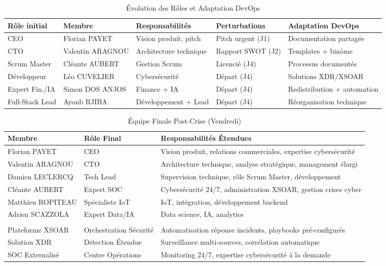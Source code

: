 \documentclass[12pt,a4paper]{article}
\begin{document}
\begin{table}[H]
\centering
\caption{Évolution des Rôles et Adaptation DevOps}
\begin{tabular}{|p{2.5cm}|p{2cm}|p{3cm}|p{3cm}|p{3cm}|}
\hline
\textbf{Rôle initial} & \textbf{Membre} & \textbf{Responsabilités} & \textbf{Perturbations} & \textbf{Adaptation DevOps} \\
\hline
CEO & Florian PAYET & Vision produit, pitch & Pitch urgent (J1) & Documentation partagée \\
\hline
CTO & Valentin ARAGNOU & Architecture technique & Rapport SWOT (J2) & Templates + binôme \\
\hline
Scrum Master & Cléante AUBERT & Gestion Scrum & Licencié (J4) & Processus documentés \\
\hline
Développeur & Léo CUVELIER & Cybersécurité & Départ (J4) & Solutions XDR/XSOAR \\
\hline
Expert Fin./IA & Simon DOS ANJOS & Finance + IA & Départ (J4) & Redistribution + automation \\
\hline
Full-Stack Lead & Ayoub RJIBA & Développement + Lead & Départ (J4) & Réorganisation technique \\
\hline
\end{tabular}
\end{table}

\begin{table}[H]
\centering
\caption{Équipe Finale Post-Crise (Vendredi)}
\begin{tabular}{|p{3cm}|p{3cm}|p{6cm}|}
\hline
\textbf{Membre} & \textbf{Rôle Final} & \textbf{Responsabilités Étendues} \\
\hline
\rowcolor{blue!10}
Florian PAYET & CEO & Vision produit, relations commerciales, expertise cybersécurité \\
\hline
\rowcolor{blue!10}
Valentin ARAGNOU & CTO & Architecture technique, analyse stratégique, management élargi \\
\hline
\rowcolor{blue!10}
Damien LECLERCQ & Tech Lead & Supervision technique, rôle Scrum Master, développement \\
\hline
\rowcolor{green!10}
Cléante AUBERT & Expert SOC & Cybersécurité 24/7, administration XSOAR, gestion crises cyber \\
\hline
\rowcolor{blue!10}
Matthieu ROPITEAU & Spécialiste IoT & IoT, intégration, développement backend \\
\hline
\rowcolor{blue!10}
Adrien SCAZZOLA & Expert Data/IA & Data science, IA, analytics \\
\hline
\hline
\rowcolor{orange!10}
\multicolumn{3}{|c|}{\textbf{Solutions Technologiques Compensatoires}} \\
\hline
\rowcolor{orange!10}
Plateforme XSOAR & Orchestration Sécurité & Automatisation réponse incidents, playbooks pré-configurés \\
\hline
\rowcolor{orange!10}
Solution XDR & Détection Étendue & Surveillance multi-sources, corrélation automatique \\
\hline
\rowcolor{orange!10}
SOC Externalisé & Centre Opérations & Monitoring 24/7, expertise cybersécurité à la demande \\
\hline
\end{tabular}
\end{table}
\end{document}
